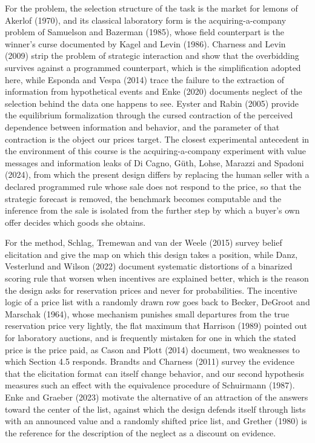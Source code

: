 \documentclass[11pt,a4paper]{article}
\begin{document}
For the problem, the selection structure of the task is the market for lemons of Akerlof (1970), and its classical laboratory form is the acquiring-a-company problem of Samuelson and Bazerman (1985), whose field counterpart is the winner's curse documented by Kagel and Levin (1986). Charness and Levin (2009) strip the problem of strategic interaction and show that the overbidding survives against a programmed counterpart, which is the simplification adopted here, while Esponda and Vespa (2014) trace the failure to the extraction of information from hypothetical events and Enke (2020) documents neglect of the selection behind the data one happens to see. Eyster and Rabin (2005) provide the equilibrium formalization through the cursed contraction of the perceived dependence between information and behavior, and the parameter of that contraction is the object our prices target. The closest experimental antecedent in the environment of this course is the acquiring-a-company experiment with value messages and information leaks of Di Cagno, G\"uth, Lohse, Marazzi and Spadoni (2024), from which the present design differs by replacing the human seller with a declared programmed rule whose sale does not respond to the price, so that the strategic forecast is removed, the benchmark becomes computable and the inference from the sale is isolated from the further step by which a buyer's own offer decides which goods she obtains.

For the method, Schlag, Tremewan and van der Weele (2015) survey belief elicitation and give the map on which this design takes a position, while Danz, Vesterlund and Wilson (2022) document systematic distortions of a binarized scoring rule that worsen when incentives are explained better, which is the reason the design asks for reservation prices and never for probabilities. The incentive logic of a price list with a randomly drawn row goes back to Becker, DeGroot and Marschak (1964), whose mechanism punishes small departures from the true reservation price very lightly, the flat maximum that Harrison (1989) pointed out for laboratory auctions, and is frequently mistaken for one in which the stated price is the price paid, as Cason and Plott (2014) document, two weaknesses to which Section 4.5 responds. Brandts and Charness (2011) survey the evidence that the elicitation format can itself change behavior, and our second hypothesis measures such an effect with the equivalence procedure of Schuirmann (1987). Enke and Graeber (2023) motivate the alternative of an attraction of the answers toward the center of the list, against which the design defends itself through lists with an announced value and a randomly shifted price list, and Grether (1980) is the reference for the description of the neglect as a discount on evidence.
\end{document}

